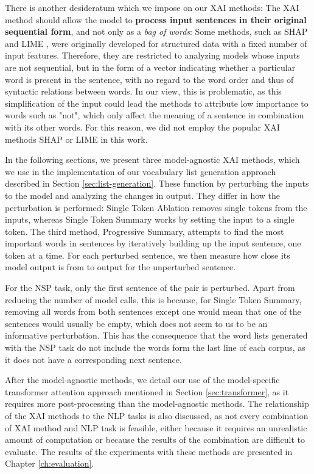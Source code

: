 There is another desideratum which we impose on our XAI methods:
The XAI method should allow the model to \textbf{process input sentences in their original sequential form}, and not only as a \textit{bag of words}:
Some methods, such as SHAP \cite{lundbergUnifiedApproachInterpreting2017} and LIME \cite{ribeiroWhyShouldTrust2016}, were originally developed for structured data with a fixed number of input features.
Therefore, they are restricted to analyzing models whose inputs are not sequential, but in the form of a vector indicating whether a particular word is present in the sentence, with no regard to the word order and thus of syntactic relations between words.
In our view, this is problematic, as this simplification of the input could lead the methods to attribute low importance to words such as "not", which only affect the meaning of a sentence in combination with its other words.
For this reason, we did not employ the popular XAI methods SHAP or LIME in this work.

In the following sections, we present three model-agnostic XAI methods, which we use in the implementation of our vocabulary list generation approach described in Section \ref{sec:list-generation}.
These function by perturbing the inputs to the model and analyzing the changes in output.
They differ in how the perturbation is performed:
Single Token Ablation removes single tokens from the inputs, whereas Single Token Summary works by setting the input to a single token.
The third method, Progressive Summary, attempts to find the most important words in sentences by iteratively building up the input sentence, one token at a time.
For each perturbed sentence, we then measure how close its model output is from to output for the unperturbed sentence.

For the NSP task, only the first sentence of the pair is perturbed.
Apart from reducing the number of model calls, this is because, for Single Token Summary, removing all words from both sentences except one would mean that one of the sentences would usually be empty, which does not seem to us to be an informative perturbation.
This has the consequence that the word lists generated with the NSP task do not include the words form the last line of each corpus, as it does not have a corresponding next sentence.

After the model-agnostic methods, we detail our use of the model-specific transformer attention approach mentioned in Section \ref{sec:transformer}, as it requires more post-processing than the model-agnostic methods.
The relationship of the XAI methods to the NLP tasks is also discussed, as not every combination of XAI method and NLP task is feasible, either because it requires an unrealistic amount of computation or because the results of the combination are difficult to evaluate.
The results of the experiments with these methods are presented in Chapter \ref{ch:evaluation}.


